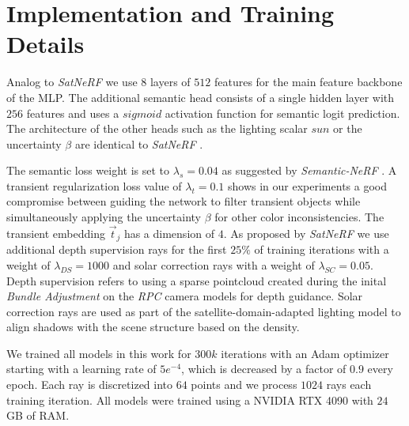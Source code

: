 


\section{Implementation and Training Details}

Analog to \emph{SatNeRF} \cite{satnerf} we use $8$ layers of $512$ features for the main feature backbone of the MLP. The additional semantic head consists of a single hidden layer with $256$ features and uses a $\mathit{sigmoid}$ activation function for semantic logit prediction. The architecture of the other heads such as the lighting scalar $\mathit{sun}$ or the uncertainty $\beta$ are identical to \emph{SatNeRF} \cite{satnerf}.

The semantic loss weight is set to $\lambda_s = 0.04$ as suggested by \emph{Semantic-NeRF} \cite{semanticnerf}.
A transient regularization loss value of $\lambda_t = 0.1$ shows in our experiments a good compromise between guiding the network to filter transient objects while simultaneously applying the uncertainty $\beta$ for other color inconsistencies.
The transient embedding $\vec{t}_j$ has a dimension of $4$.
As proposed by \emph{SatNeRF} \cite{satnerf} we use additional depth supervision rays for the first $25\%$ of training iterations with a weight of $\lambda_{DS} = 1000$ and solar correction rays with a weight of $\lambda_{SC} = 0.05$.
Depth supervision refers to using a sparse pointcloud created during the inital \emph{Bundle Adjustment} on the \emph{RPC} camera models for depth guidance. 
Solar correction rays are used as part of the satellite-domain-adapted lighting model to align shadows with the scene structure based on the density. 


We trained all models in this work for $300k$ iterations with an Adam optimizer starting with a learning rate of $5e^{-4}$, which is decreased by a factor of $0.9$ every epoch. Each ray is discretized into $64$ points and we process $1024$ rays each training iteration. 
All models were trained using a NVIDIA RTX 4090 with $24$ GB of RAM. 



